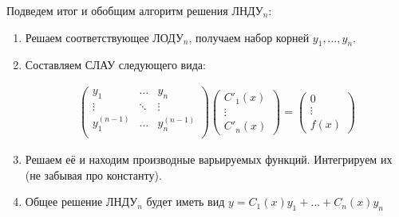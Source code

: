 Подведем итог и обобщим алгоритм решения ЛНДУ\(_n\):
\begin{enumerate}
  \item Решаем соответствующее ЛОДУ\(_n\), получаем набор корней
  \(y_{1}, \dots, y_{n}\).

  \item Составляем СЛАУ следующего вида:
  
  \begin{align*}
    \begin{pmatrix}
      y_{1} & \dotsc & y_{n} \\
     \vdots & \ddots & \vdots \\
      y^{(n - 1)}_{1} & \dotsc & y^{(n - 1)}_{n} \\
    \end{pmatrix}
    \begin{pmatrix}
      C'_{1}(x) \\
      \vdots \\
      C'_{n}(x)
    \end{pmatrix}
    =
    \begin{pmatrix}
      0 \\
      \vdots \\
      f(x)
    \end{pmatrix}
  \end{align*}

  \item Решаем её и находим производные варьируемых функций. Интегрируем их
  (не забывая про константу).

  \item Общее решение ЛНДУ\(_n\) будет иметь вид
  \(y = C_{1}(x) y_{1} + \dotsc + C_{n}(x) y_{n}\)
\end{enumerate}
